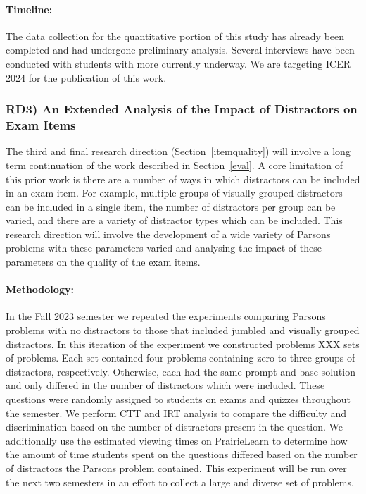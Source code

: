 \documentclass[authorversion,nonacm]{acmart}
\begin{document}
\paragraph{Timeline:} The data collection for the quantitative portion of this
study has already been completed and had undergone preliminary analysis. Several 
interviews have been conducted with students with more currently underway. We are 
targeting ICER 2024 for the publication of this work.
 
\subsubsection{RD3) An Extended Analysis of the Impact of Distractors on Exam Items }\label{sec:itemquality}

The third and final research direction (Section~\ref{itemquality}) will
involve a long term continuation of the work described in Section~\ref{eval}.
A core limitation of this prior work is there are a number of ways in which 
distractors can be included in an exam item. For example, multiple groups 
of visually grouped distractors can be included in a single item, the number 
of distractors per group can be varied, and there are a variety of distractor 
types which can be included. This research direction will involve the development
of a wide variety of Parsons problems with these parameters varied and analysing
the impact of these parameters on the quality of the exam items.

\paragraph{Methodology:} In the Fall 2023 semester we repeated the experiments
comparing Parsons problems with no distractors to those that included jumbled
and visually grouped distractors. In this iteration of the experiment we
constructed problems XXX sets of problems. Each set contained four problems
containing zero to three groups of distractors, respectively. Otherwise, each
had the same prompt and base solution and only differed in the number of
distractors which were included. These questions were randomly assigned to
students on exams and quizzes throughout the semester. We perform CTT and IRT
analysis to compare the difficulty and discrimination based on the number of
distractors present in the question. We additionally use the estimated viewing
times on PrairieLearn to determine how the amount of time students spent on the
questions differed based on the number of distractors the Parsons problem
contained. This experiment will be run over the next two semesters in an 
effort to collect a large and diverse set of problems.
\end{document}
